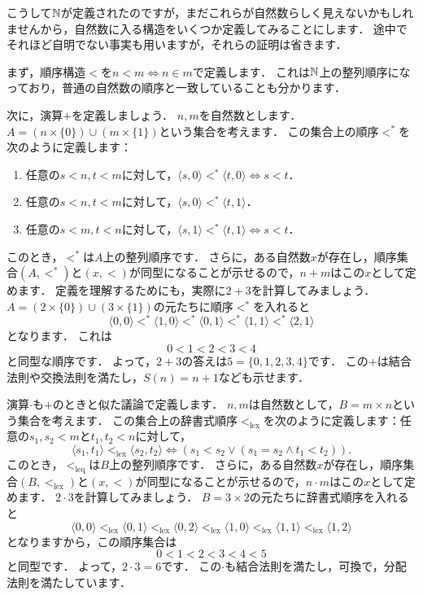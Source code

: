 \documentclass[./main]{subfiles}
\begin{document}
こうして$\mathbb{N}$が定義されたのですが，まだこれらが自然数らしく見えないかもしれませんから，自然数に入る構造をいくつか定義してみることにします．
途中でそれほど自明でない事実も用いますが，それらの証明は省きます．

まず，順序構造$<$を$n<m\iff n\in m$で定義します．
これは$\mathbb{N}$上の整列順序になっており，普通の自然数の順序と一致していることも分かります．

次に，演算$+$を定義しましょう．
$n, m$を自然数とします．
$A=(n\times\{0\})\cup(m\times\{1\})$という集合を考えます．
この集合上の順序$<^{*}$を次のように定義します：
\begin{enumerate}
\item 任意の$s<n, t<m$に対して，$\langle s, 0\rangle <^{*}\langle t, 0\rangle\iff s<t$．
\item 任意の$s<n, t<m$に対して，$\langle s, 0\rangle <^{*} \langle t, 1\rangle$．
\item 任意の$s<m, t<n$に対して，$\langle s, 1\rangle <^{*}\langle t, 1\rangle\iff s<t$．
\end{enumerate}
このとき，$<^{*}$は$A$上の整列順序です．
さらに，ある自然数$x$が存在し，順序集合$(A, <^{*})$と$(x, <)$が同型になることが示せるので，$n+m$はこの$x$として定めます．
定義を理解するためにも，実際に$2+3$を計算してみましょう．
$A=(2\times\{0\})\cup(3\times\{1\})$の元たちに順序$<^{*}$を入れると
\[
\langle 0, 0\rangle <^{*} \langle 1, 0\rangle <^{*} \langle 0, 1\rangle <^{*} \langle 1, 1 \rangle <^{*} \langle 2, 1 \rangle
\]
となります．
これは
\[
0 < 1 < 2 < 3 < 4
\]
と同型な順序です．
よって，$2+3$の答えは$5=\{0, 1, 2, 3, 4\}$です．
この$+$は結合法則や交換法則を満たし，$S(n)=n+1$なども示せます．

演算$\cdot$も$+$のときと似た議論で定義します．
$n, m$は自然数として，$B=m\times n$という集合を考えます．
この集合上の辞書式順序$<_{\text{lex}}$を次のように定義します：任意の$s_1, s_2 < m$と$t_1, t_2 < n$に対して，
\[
\langle s_1, t_1\rangle <_{\text{lex}}\langle s_2, t_2\rangle\iff (s_1 < s_2 \lor (s_1 = s_2 \land t_1 < t_2)).
\]
このとき，$<_{\text{leq}}$は$B$上の整列順序です．
さらに，ある自然数$x$が存在し，順序集合$(B, <_{\text{lex}})$と$(x, <)$が同型になることが示せるので，$n\cdot m$はこの$x$として定めます．
$2\cdot 3$を計算してみましょう．
$B=3\times 2$の元たちに辞書式順序を入れると
\[
\langle 0, 0\rangle <_{\text{lex}} \langle 0, 1\rangle <_{\text{lex}} \langle 0, 2\rangle <_{\text{lex}} \langle 1, 0 \rangle <_{\text{lex}} \langle 1, 1\rangle <_{\text{lex}} \langle 1, 2\rangle
\]
となりますから，この順序集合は
\[
0<1<2<3<4<5
\]
と同型です．
よって，$2\cdot 3 = 6$です．
この$\cdot$も結合法則を満たし，可換で，分配法則を満たしています．
\end{document}
